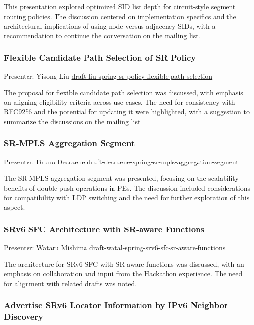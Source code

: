 \documentclass{article}
\begin{document}
This presentation explored optimized SID list depth for circuit-style segment routing policies. The discussion centered on implementation specifics and the architectural implications of using node versus adjacency SIDs, with a recommendation to continue the conversation on the mailing list.

\subsubsection{Flexible Candidate Path Selection of SR Policy}

Presenter: Yisong Liu  
\href{https://datatracker.ietf.org/doc/draft-liu-spring-sr-policy-flexible-path-selection/}{draft-liu-spring-sr-policy-flexible-path-selection}

The proposal for flexible candidate path selection was discussed, with emphasis on aligning eligibility criteria across use cases. The need for consistency with RFC9256 and the potential for updating it were highlighted, with a suggestion to summarize the discussions on the mailing list.

\subsubsection{SR-MPLS Aggregation Segment}

Presenter: Bruno Decraene  
\href{https://datatracker.ietf.org/doc/draft-decraene-spring-sr-mpls-aggregation-segment/}{draft-decraene-spring-sr-mpls-aggregation-segment}

The SR-MPLS aggregation segment was presented, focusing on the scalability benefits of double push operations in PEs. The discussion included considerations for compatibility with LDP switching and the need for further exploration of this aspect.

\subsubsection{SRv6 SFC Architecture with SR-aware Functions}

Presenter: Wataru Mishima  
\href{https://datatracker.ietf.org/doc/draft-watal-spring-srv6-sfc-sr-aware-functions/}{draft-watal-spring-srv6-sfc-sr-aware-functions}

The architecture for SRv6 SFC with SR-aware functions was discussed, with an emphasis on collaboration and input from the Hackathon experience. The need for alignment with related drafts was noted.

\subsubsection{Advertise SRv6 Locator Information by IPv6 Neighbor Discovery}
\end{document}
